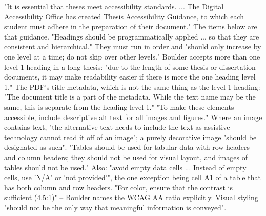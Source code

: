 %
	{"It is essential that theses meet accessibility standards. ... The Digital
	 Accessibility Office has created Thesis Accessibility Guidance, to which
	 each student must adhere in the preparation of their document." The items
	 below are that guidance.}
	{"Headings should be programmatically applied ... so that they are consistent
	 and hierarchical." They must run in order and "should only increase by one
	 level at a time; do not skip over other levels." Boulder accepts more than
	 one level-1 heading in a long thesis: "due to the length of some thesis or
	 dissertation documents, it may make readability easier if there is more the
	 one heading level 1."}
	{The PDF's title metadata, which is not the same thing as the level-1
	 heading: "The document title is a part of the metadata. While the text name
	 may be the same, this is separate from the heading level 1."}
	{"To make these elements accessible, include descriptive alt text for all
	 images and figures." Where an image contains text, "the alternative text
	 needs to include the text as assistive technology cannot read it off of an
	 image"; a purely decorative image "should be designated as such".}
	{"Tables should be used for tabular data with row headers and column headers;
	 they should not be used for visual layout, and images of tables should not
	 be used." Also: "avoid empty data cells ... Instead of empty cells, use
	 'N/A' or 'not provided'", the one exception being cell A1 of a table that
	 has both column and row headers.}
	{"For color, ensure that the contrast is sufficient (4.5:1)" -- Boulder names
	 the WCAG AA ratio explicitly. Visual styling "should not be the only way
	 that meaningful information is conveyed".}

